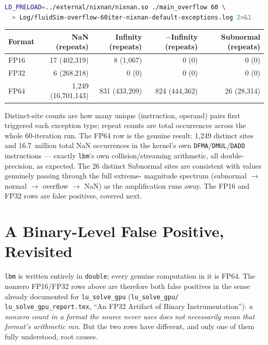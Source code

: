 \documentclass[11pt,a4paper]{article}
\begin{document}
\begin{lstlisting}[language=bash]
LD_PRELOAD=../external/nixnan/nixnan.so ./main_overflow 60 \
  > Log/fluidSim-overflow-60iter-nixnan-default-exceptions.log 2>&1
\end{lstlisting}

\begin{center}
\begin{tabular}{lrrrr}
\toprule
Format & NaN (repeats) & Infinity (repeats) & $-$Infinity (repeats) & Subnormal (repeats) \\
\midrule
FP16 & 17 (402{,}319) & 8 (1{,}067) & 0 (0) & 0 (0) \\
FP32 & 6 (268{,}218) & 0 (0) & 0 (0) & 0 (0) \\
FP64 & 1{,}249 (16{,}701{,}143) & 831 (433{,}209) & 824 (444{,}362) & 26 (28{,}314) \\
\bottomrule
\end{tabular}
\end{center}
Distinct-site counts are how many unique (instruction, operand) pairs
first triggered each exception type; repeat counts are total occurrences
across the whole 60-iteration run. The FP64 row is the genuine result:
1,249 distinct sites and 16.7~million total NaN occurrences in the
kernel's own \texttt{DFMA}/\texttt{DMUL}/\texttt{DADD} instructions ---
exactly \texttt{lbm}'s own collision/streaming arithmetic, all
double-precision, as expected. The 26 distinct Subnormal sites are
consistent with values genuinely passing through the full extreme-
magnitude spectrum (subnormal $\to$ normal $\to$ overflow $\to$ NaN) as
the amplification runs away. The FP16 and FP32 rows are false positives,
covered next.

\section{A Binary-Level False Positive, Revisited}
\label{sec:falsepos}
\label{sec:falsepos-intro}

\texttt{lbm} is written entirely in \texttt{double}; every genuine
computation in it is FP64. The nonzero FP16/FP32 rows above are therefore
both false positives in the sense already documented for
\texttt{lu\_solve\_gpu}
(\texttt{lu\_solve\_\allowbreak gpu/\allowbreak
lu\_solve\_gpu\_\allowbreak report.tex}, ``An FP32 Artifact of
Binary Instrumentation''): \emph{a nonzero count in a format the source
never uses does not necessarily mean that format's arithmetic ran.} But
the two rows have different, and only one of them fully understood,
root causes.
\end{document}
